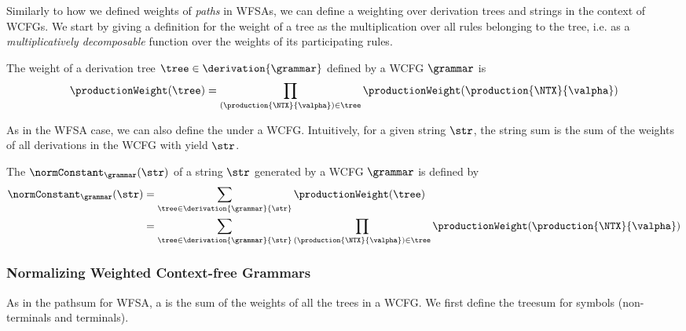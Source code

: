 Similarly to how we defined weights of \emph{paths} in WFSAs, we can define a weighting over derivation trees and strings in the context of WCFGs. 
We start by giving a definition for the weight of a tree as the multiplication over all rules belonging to the tree, i.e. as a \emph{multiplicatively decomposable} function over the weights of its participating rules.

\begin{definition}
The weight of a derivation tree $\tree\in\derivation{\grammar}$ defined by a WCFG $\grammar$ is
\begin{equation}
    \productionWeight(\tree)=\prod_{(\production{\NTX}{\valpha})\in \tree}\productionWeight(\production{\NTX}{\valpha})
\end{equation}
\end{definition}
As in the WFSA case, we can also define the  under a WCFG.
Intuitively, for a given string $\str$, the string sum is the sum of the weights of all derivations in the WCFG with yield $\str$.
\begin{definition}
The  $\normConstant_{\grammar}(\str)$ of a string $\str$ generated by a WCFG $\grammar$ is defined by
\begin{align}
    \normConstant_{\grammar}(\str) & = \sum_{\tree\in\derivation{\grammar}{\str}}\productionWeight(\tree)\\
    & = \sum_{\tree\in\derivation{\grammar}{\str}}\prod_{(\production{\NTX}{\valpha})\in\tree}\productionWeight(\production{\NTX}{\valpha})
\end{align}
\end{definition}

\subsubsection{Normalizing Weighted Context-free Grammars}
As in the pathsum for WFSA, a  is the sum of the weights of all the trees in a WCFG. 
We first define the treesum for symbols (non-terminals and terminals).

